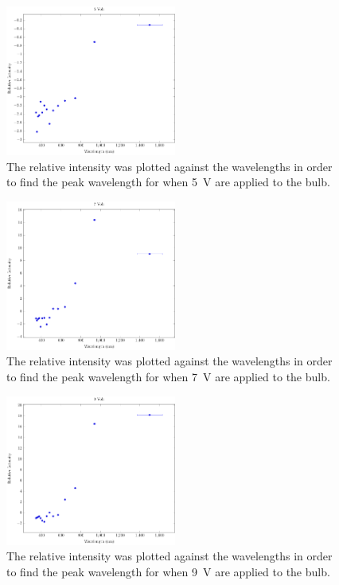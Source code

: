 \documentclass[a4paper]{article}
\begin{document}
\begin{figure}[H]
  \begin{center}
    \includegraphics[width=0.5\textwidth]{P6-BlackbodyRadiation/Plots/5Volt/5volt.pdf}
  \end{center}
  \label{gph:5volt}
  \caption{The relative intensity was plotted against the wavelengths in order
    to find the peak wavelength for when \SI{5}{\volt} are applied to the bulb.}
\end{figure}

\begin{figure}[H]
  \begin{center}
    \includegraphics[width=0.5\textwidth]{P6-BlackbodyRadiation/Plots/7Volt/7volt.pdf}
  \end{center}
  \label{gph:7volt}
  \caption{The relative intensity was plotted against the wavelengths in order
    to find the peak wavelength for when \SI{7}{\volt} are applied to the bulb.}
\end{figure}

\begin{figure}[H]
  \begin{center}
    \includegraphics[width=0.5\textwidth]{P6-BlackbodyRadiation/Plots/9Volt/9volt.pdf}
  \end{center}
  \label{gph:9volt}
  \caption{The relative intensity was plotted against the wavelengths in order
    to find the peak wavelength for when \SI{9}{\volt} are applied to the bulb.}
\end{figure}
\end{document}
